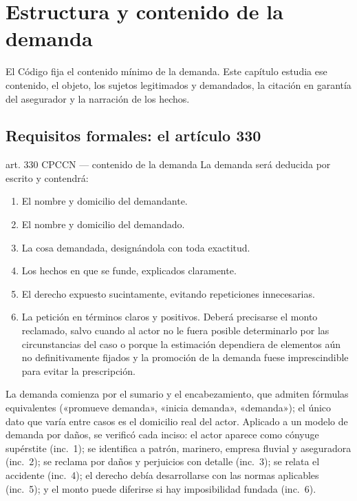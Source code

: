 \documentclass[12pt,oneside]{book}
\begin{document}
\chapter{Estructura y contenido de la demanda}\label{cap:estructura-demanda}

El Código fija el contenido mínimo de la demanda. Este capítulo estudia ese contenido, el objeto, los sujetos legitimados y demandados, la citación en garantía del asegurador y la narración de los hechos.

\section{Requisitos formales: el artículo 330}

\begin{regla}{art. 330 CPCCN --- contenido de la demanda}
La demanda será deducida por escrito y contendrá:
\begin{enumerate}[label=\arabic*.\textsuperscript{o})]
\item El nombre y domicilio del demandante.
\item El nombre y domicilio del demandado.
\item La cosa demandada, designándola con toda exactitud.
\item Los hechos en que se funde, explicados claramente.
\item El derecho expuesto sucintamente, evitando repeticiones innecesarias.
\item La petición en términos claros y positivos. Deberá precisarse el monto reclamado, salvo cuando al actor no le fuera posible determinarlo por las circunstancias del caso o porque la estimación dependiera de elementos aún no definitivamente fijados y la promoción de la demanda fuese imprescindible para evitar la prescripción.
\end{enumerate}
\end{regla}

La demanda comienza por el sumario y el encabezamiento, que admiten fórmulas equivalentes («promueve demanda», «inicia demanda», «demanda»); el único dato que varía entre casos es el domicilio real del actor. Aplicado a un modelo de demanda por daños, se verificó cada inciso: el actor aparece como cónyuge supérstite (inc.~1); se identifica a patrón, marinero, empresa fluvial y aseguradora (inc.~2); se reclama por daños y perjuicios con detalle (inc.~3); se relata el accidente (inc.~4); el derecho debía desarrollarse con las normas aplicables (inc.~5); y el monto puede diferirse si hay imposibilidad fundada (inc.~6).
\end{document}
